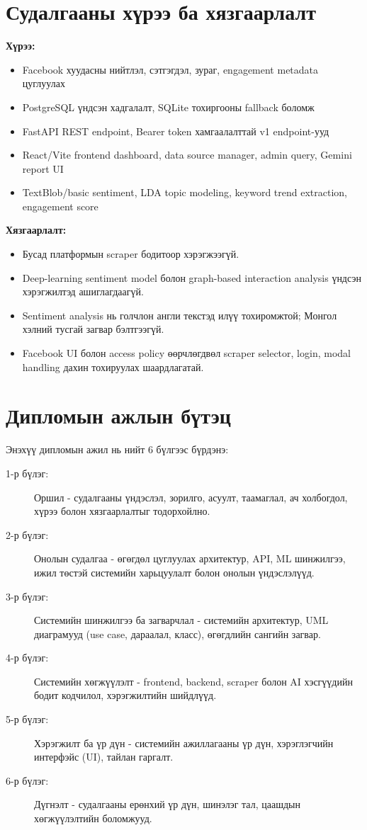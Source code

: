 \section{Судалгааны хүрээ ба хязгаарлалт}

\textbf{Хүрээ:}
\begin{itemize}
    \item Facebook хуудасны нийтлэл, сэтгэгдэл, зураг, engagement metadata цуглуулах
    \item PostgreSQL үндсэн хадгалалт, SQLite тохиргооны fallback боломж
    \item FastAPI REST endpoint, Bearer token хамгаалалттай v1 endpoint-ууд
    \item React/Vite frontend dashboard, data source manager, admin query, Gemini report UI
    \item TextBlob/basic sentiment, LDA topic modeling, keyword trend extraction, engagement score
\end{itemize}

\textbf{Хязгаарлалт:}
\begin{itemize}
    \item Бусад платформын scraper бодитоор хэрэгжээгүй.
    \item Deep-learning sentiment model болон graph-based interaction analysis үндсэн хэрэгжилтэд ашиглагдаагүй.
    \item Sentiment analysis нь голчлон англи текстэд илүү тохиромжтой; Монгол хэлний тусгай загвар бэлтгээгүй.
    \item Facebook UI болон access policy өөрчлөгдвөл scraper selector, login, modal handling дахин тохируулах шаардлагатай.
\end{itemize}

\section{Дипломын ажлын бүтэц}

Энэхүү дипломын ажил нь нийт 6 бүлгээс бүрдэнэ:
\begin{description}
    \item[1-р бүлэг:] Оршил - судалгааны үндэслэл, зорилго, асуулт, таамаглал, ач холбогдол, хүрээ болон хязгаарлалтыг тодорхойлно.
    \item[2-р бүлэг:] Онолын судалгаа - өгөгдөл цуглуулах архитектур, API, ML шинжилгээ, ижил төстэй системийн харьцуулалт болон онолын үндэслэлүүд.
    \item[3-р бүлэг:] Системийн шинжилгээ ба загварчлал - системийн архитектур, UML диаграмууд (use case, дараалал, класс), өгөгдлийн сангийн загвар.
    \item[4-р бүлэг:] Системийн хөгжүүлэлт - frontend, backend, scraper болон AI хэсгүүдийн бодит кодчилол, хэрэгжилтийн шийдлүүд.
    \item[5-р бүлэг:] Хэрэгжилт ба үр дүн - системийн ажиллагааны үр дүн, хэрэглэгчийн интерфэйс (UI), тайлан гаргалт.
    \item[6-р бүлэг:] Дүгнэлт - судалгааны ерөнхий үр дүн, шинэлэг тал, цаашдын хөгжүүлэлтийн боломжууд.
\end{description}
